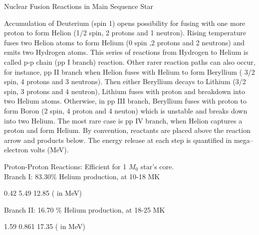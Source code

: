 \begin{notebox}[sharp corners, width=\textwidth]{Nuclear Fusion Reactions in Main Sequence Star}

{\small Accumulation of Deuterium (spin 1) opens possibility for fusing with one more proton to form Helion (1/2 spin, 2 protons and 1 neutron). Rising temperature fuses two Helion atoms to form Helium (0 spin ,2 protons and 2 neutrons) and emits two Hydrogen atoms. This series of reactions from Hydrogen to Helium is called p-p chain (pp I branch) reaction. Other rarer reaction paths can also occur, for instance, pp II branch when Helion fuses with Helium to form Beryllium ( 3/2 spin, 4 protons and 3 neutrons). Then either Beryllium decays to Lithium (3/2 spin, 3 protons and 4 neutron), Lithium fuses with proton and breakdown into two Helium atoms. Otherwise, in pp III branch, Beryllium fuses with proton to form Boron (2 spin, 4 proton and 4 neuton) which is unstable and breaks down into two Helium. The most rare case is pp IV branch, when Helion captures a proton and form Helium. By convention, reactants are placed above the reaction arrow and products below. The energy release at each step is quantified in mega–electron volts (MeV).
}

Proton-Proton Reactions: Efficient for 1 $M_0$ star's core. \\

\hspace{1cm} Branch I: 83.30\% Helium production, at 10-18 MK


\begin{center}
\end{center}

\hspace{4.5cm} 0.42 \hspace{0.7cm} 5.49 \hspace{0.7cm} 12.85  \hfill ( in MeV)

\hspace{1cm} Branch II: 16.70 \% Helium production, at 18-25 MK

\begin{center}
\end{center}
\vspace{-2mm}
	\hspace{4.5cm} 1.59 \hspace{0.6cm} 0.861 \hspace{0.5cm} 17.35 \hspace{0.9cm} \hfill ( in MeV)
	\vspace{1mm}


\end{notebox}
